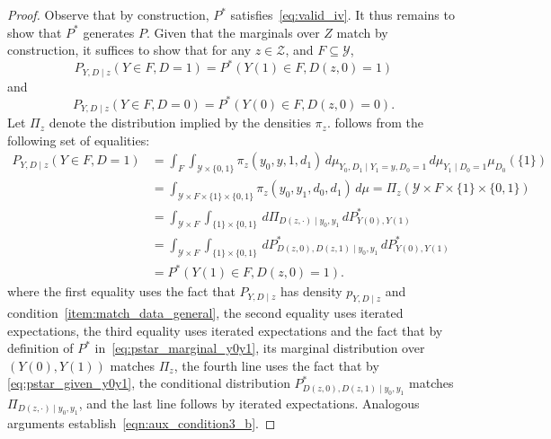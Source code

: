 \documentclass[12pt]{article}%
\theoremstyle{definition}
\newcommand\1{\operatorname{I}\indicatorfence}
\begin{document}
\begin{appendices}
\begin{proof}
  Observe that by construction, $P^{*}$
  satisfies~\cref{eq:valid_iv}. It thus remains to show that
  $P^{*}$ generates $P$. Given that the marginals over $Z$ match by
  construction, it suffices to show that for any $z\in\mathcal{Z}$, and
  $F\subseteq \mathcal{Y}$,
  \begin{equation} \label{eqn:aux_condition3_a}
    P_{Y, D\mid z}(Y \in F, D=1) =
    P^{*} \left(Y(1) \in F, D(z, 0)=1
    \right)
  \end{equation}
  and
  \begin{equation} \label{eqn:aux_condition3_b}
    P_{Y, D\mid z}(Y \in F, D=0) =
    P^{*} \left(Y(0) \in F, D(z, 0)=0
    \right).
  \end{equation}
  Let $\Pi_z$ denote the distribution implied by the densities $\pi_z$.
   follows from the following set of equalities:
  \begin{equation*}
    \begin{split}
      P_{Y, D\mid z}(Y \in F, D=1)
      &=
        \int_{F} \int_{\mathcal{Y} \times \{0,1\}} \pi_{z} (y_0, y,
        1, d_1)\, d\mu_{Y_{0}, D_{1}\mid Y_{1}=y, D_{0}=1}\, d\mu_{Y_{1}\mid D_{0}=1}
        \mu_{D_{0}}(\{1\})\\
      & =\int_{\mathcal{Y}\times F\times \{1\}\times \{0,1\}}
        \pi_{z} (y_0, y_{1}, d_{0}, d_1)\, d\mu=\Pi_{z}
        (\mathcal{Y}\times F\times  \{1\}\times \{0,1\})\\
      &=\int_{\mathcal{Y}\times F}\int_{\{1\}\times \{0,1\}}
        \, d\Pi_{D(z, \cdot)\mid y_0,y_1} \, d P^{*}_{Y(0), Y(1)}\\
      &=\int_{\mathcal{Y}\times F}\int_{\{1\}\times \{0,1\}}
        \, d P^{*}_{D(z,0), D(z,1)\mid y_{0}, y_{1}}
        \, d P^{*}_{Y(0), Y(1)}\\
      &=P^{*}(Y(1)\in F, D(z, 0)=1).
    \end{split}
  \end{equation*}
  where the first equality uses the fact that $P_{Y, D\mid z}$ has density
  $p_{Y, D\mid z}$ and condition~\ref{item:match_data_general}, the second
  equality uses iterated expectations, the third equality uses iterated
  expectations and the fact that by definition of $P^{*}$
  in~\cref{eq:pstar_marginal_y0y1}, its marginal distribution over
  $(Y(0), Y(1))$ matches $\Pi_{z}$, the fourth line uses the fact that by
  \cref{eq:pstar_given_y0y1}, the conditional distribution
  $P^{*}_{D(z,0), D(z,1)\mid y_{0}, y_{1}}$ matches $\Pi_{D(z, \cdot)\mid y_0,y_1} $, and
  the last line follows by iterated expectations. Analogous arguments
  establish~\cref{eqn:aux_condition3_b}.
\end{proof}


\end{appendices}
\end{document}
